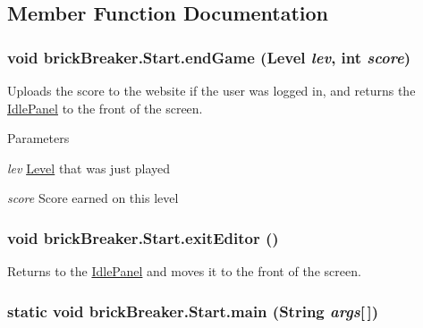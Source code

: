 \subsection{Member Function Documentation}
\hypertarget{classbrick_breaker_1_1_start_a794a63dad7a962820d9dd5bf26bf2e35}{
\subsubsection[{endGame}]{\setlength{\rightskip}{0pt plus 5cm}void brickBreaker.Start.endGame ({\bf Level} {\em lev}, \/  int {\em score})}}
\label{classbrick_breaker_1_1_start_a794a63dad7a962820d9dd5bf26bf2e35}
Uploads the score to the website if the user was logged in, and returns the \hyperlink{classbrick_breaker_1_1_idle_panel}{IdlePanel} to the front of the screen. 
\begin{DoxyParams}{Parameters}
\item[{\em lev}]\hyperlink{classbrick_breaker_1_1_level}{Level} that was just played \item[{\em score}]Score earned on this level \end{DoxyParams}
\hypertarget{classbrick_breaker_1_1_start_af99a0afe969ad087b6315a19e8b2289c}{
\subsubsection[{exitEditor}]{\setlength{\rightskip}{0pt plus 5cm}void brickBreaker.Start.exitEditor ()}}
\label{classbrick_breaker_1_1_start_af99a0afe969ad087b6315a19e8b2289c}
Returns to the \hyperlink{classbrick_breaker_1_1_idle_panel}{IdlePanel} and moves it to the front of the screen. \hypertarget{classbrick_breaker_1_1_start_a1c5523121a86c315e8487d3dc826500c}{
\subsubsection[{main}]{\setlength{\rightskip}{0pt plus 5cm}static void brickBreaker.Start.main (String {\em args}\mbox{[}$\,$\mbox{]})}}
\label{classbrick_breaker_1_1_start_a1c5523121a86c315e8487d3dc826500c}
